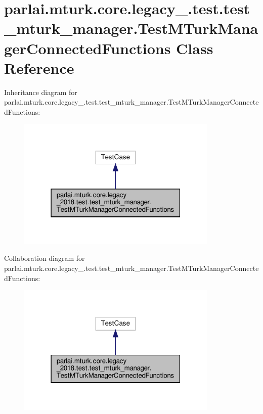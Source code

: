 \hypertarget{classparlai_1_1mturk_1_1core_1_1legacy__2018_1_1test_1_1test__mturk__manager_1_1TestMTurkManagerConnectedFunctions}{}\section{parlai.\+mturk.\+core.\+legacy\+\_.\+test.\+test\+\_\+mturk\+\_\+manager.\+Test\+M\+Turk\+Manager\+Connected\+Functions Class Reference}
\label{classparlai_1_1mturk_1_1core_1_1legacy__2018_1_1test_1_1test__mturk__manager_1_1TestMTurkManagerConnectedFunctions}


Inheritance diagram for parlai.\+mturk.\+core.\+legacy\+\_.\+test.\+test\+\_\+mturk\+\_\+manager.\+Test\+M\+Turk\+Manager\+Connected\+Functions\+:
\nopagebreak
\begin{figure}[H]
\begin{center}
\leavevmode
\includegraphics[width=271pt]{d6/dad/classparlai_1_1mturk_1_1core_1_1legacy__2018_1_1test_1_1test__mturk__manager_1_1TestMTurkManagere001427999a81d6c9d785f1c9fe5538c}
\end{center}
\end{figure}


Collaboration diagram for parlai.\+mturk.\+core.\+legacy\+\_.\+test.\+test\+\_\+mturk\+\_\+manager.\+Test\+M\+Turk\+Manager\+Connected\+Functions\+:
\nopagebreak
\begin{figure}[H]
\begin{center}
\leavevmode
\includegraphics[width=271pt]{d5/d1d/classparlai_1_1mturk_1_1core_1_1legacy__2018_1_1test_1_1test__mturk__manager_1_1TestMTurkManagerConnectedFunctions__coll__graph}
\end{center}
\end{figure}
